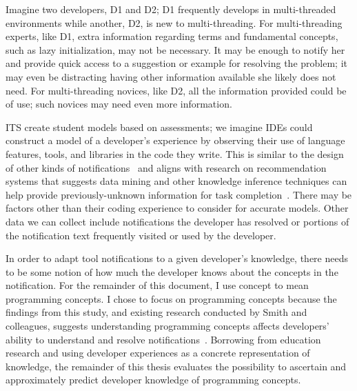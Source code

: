 Imagine two developers, D1 and D2; D1 frequently develops in multi-threaded environments while another, D2, is new to multi-threading. 
For multi-threading experts, like D1, extra information regarding terms and fundamental concepts, such as lazy initialization, may not be necessary. 
It may be enough to notify her and provide quick access to a suggestion or example for resolving the problem; it may even be distracting having other information available she likely does not need. 
For multi-threading novices, like D2, all the information provided could be of use; such novices may need even more information.

ITS create student models based on assessments; we imagine IDEs could construct a model of a
developer's experience by observing their use of language features, tools, and libraries in the code they write.
This is similar to the design of other kinds of notifications~\cite{mccrickard2003attuning, sow2005tasks, Zhang:2005} 
and aligns with research on recommendation systems that suggests data mining and 
other knowledge inference techniques can help provide previously-unknown 
information for task completion~\cite{robillard2014recommendation}.
There may be factors other than their coding experience to consider for accurate models. Other data we can collect include notifications the developer has resolved or portions of the notification text frequently visited or used by the developer.

In order to adapt tool notifications to a given developer's knowledge, there needs to be some notion of how much the developer knows about the concepts in the notification. For the remainder of this document, I use concept to mean programming concepts. I chose to focus on programming concepts because the findings from this study, and existing research conducted by Smith and colleagues, suggests understanding programming concepts affects developers' ability to understand and resolve notifications~\cite{smith2015questions}. Borrowing from education research and using developer experiences as a concrete representation of knowledge, the remainder of this thesis evaluates the possibility to ascertain and approximately predict developer knowledge of programming concepts.
